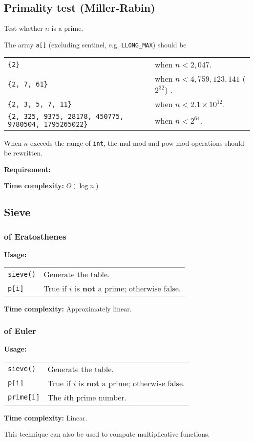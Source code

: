 \subsection{Primality test (Miller-Rabin)}
Test whether $n$ is a prime. \par
The array \lstinline|a[]| (excluding sentinel, e.g. \lstinline|LLONG_MAX|) should be \\
\begin{tabular}{p{6cm} p{5cm}}
  \lstinline|{2}| & when $n < 2,047$. \\
  \lstinline|{2, 7, 61}| & when $n < 4,759,123,141$ ($2^{32}$) . \\
  \lstinline|{2, 3, 5, 7, 11}| & when $n < 2.1 \times 10^{12}$. \\
  \lstinline|{2, 325, 9375, 28178, 450775, 9780504, 1795265022}| & when $n < 2^{64}$.
\end{tabular} \par
\Warning When $n$ exceeds the range of \lstinline|int|, the mul-mod and pow-mod operations should be rewritten. \par
\textbf{Requirement:} \\
 \par
\textbf{Time complexity:} $O(\log n)$ \par


\subsection{Sieve}
\subsubsection{of Eratosthenes}
\textbf{Usage:} \\[0.1cm]
\begin{tabular}{p{3cm} p{8cm}}
  \lstinline|sieve()| & Generate the table. \\
  \lstinline|p[i]| & True if $i$ is \textbf{not} a prime; otherwise false.
\end{tabular} \par
\textbf{Time complexity:} Approximately linear. \par


\subsubsection{of Euler}
\textbf{Usage:} \\[0.1cm]
\begin{tabular}{p{3cm} p{8cm}}
  \lstinline|sieve()| & Generate the table. \\
  \lstinline|p[i]| & True if $i$ is \textbf{not} a prime; otherwise false. \\
  \lstinline|prime[i]| & The $i$th prime number.
\end{tabular} \par
\textbf{Time complexity:} Linear. \par

This technique can also be used to compute multiplicative functions.


